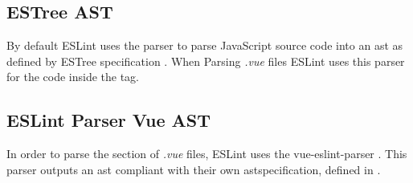 \subsection{ESTree AST}
By default ESLint uses the \parencite{eslintEspree} parser to parse JavaScript source code into an \gls{ast} as defined by ESTree specification \parencite{estreeASTSpec}. When Parsing \textit{.vue} files ESLint uses this parser for the code inside the  tag.
  
\subsection{ESLint Parser Vue AST}
In order to parse the  section of \textit{.vue} files, ESLint uses the vue-eslint-parser \parencite{eslint_vue_parser}. This parser outputs an  \gls{ast} compliant with their own  \gls{ast}specification, defined in \parencite{eslint_vue_parser_ast}.

